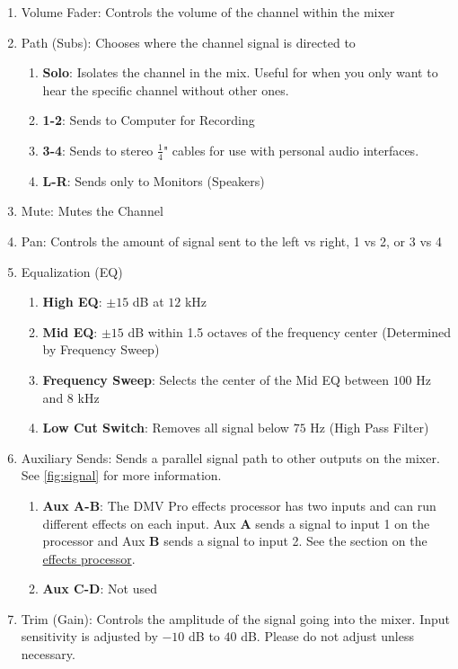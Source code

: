 \documentclass{tufte-book} %
\begin{document}
\begin{enumerate}
	\item Volume Fader: Controls the volume of the channel within the mixer
	\item Path (Subs): Chooses where the channel signal is directed to
	\begin{enumerate}
		\item \textbf{Solo}: Isolates the channel in the mix. Useful for when you only want to hear the specific channel without other ones. 
		\item \textbf{1-2}: Sends to Computer for Recording
		\item \textbf{3-4}: Sends to stereo $\frac{1}{4}$" cables for use with personal audio interfaces. 
		\item \textbf{L-R}: Sends only to Monitors (Speakers)
	\end{enumerate}
	\item Mute: Mutes the Channel 
	\item Pan: Controls the amount of signal sent to the left vs right, 1 vs 2, or 3 vs 4
	\item Equalization (EQ) 
	\begin{enumerate}
		\item \textbf{High EQ}: $\pm 15$ dB at $12$ kHz
		\item \textbf{Mid EQ}: $\pm 15$ dB within 1.5 octaves of the frequency center (Determined by Frequency Sweep) 
		\item \textbf{Frequency Sweep}: Selects the center of the Mid EQ between $100$ Hz and $8$ kHz 
		\item \textbf{Low Cut Switch}: Removes all signal below $75$ Hz (High Pass Filter) 
	\end{enumerate}
	\item Auxiliary Sends: Sends a parallel signal path to other outputs on the mixer. See \ref{fig:signal} for more information. 
	\begin{enumerate}
		\item \textbf{Aux A-B}: The DMV Pro effects processor has two inputs and can run different effects on each input. Aux \textbf{A} sends a signal to input 1 on the processor and Aux \textbf{B} sends a signal to input 2. See the section on the \hyperlink{effects processor}{effects processor}. 
		\item \textbf{Aux C-D}: Not used 
	\end{enumerate}
	\item Trim (Gain): Controls the amplitude of the signal going into the mixer. Input sensitivity is adjusted by $-10$ dB to $40$ dB. Please do not adjust unless necessary. 
\end{enumerate}
\end{document}

